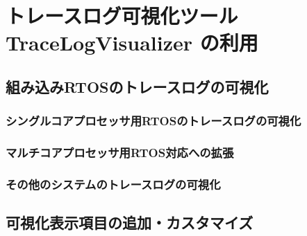 \chapter{トレースログ可視化ツール TraceLogVisualizer の利用}

\section{組み込みRTOSのトレースログの可視化}

\subsection{シングルコアプロセッサ用RTOSのトレースログの可視化}

\subsection{マルチコアプロセッサ用RTOS対応への拡張}

\subsection{その他のシステムのトレースログの可視化}

\section{可視化表示項目の追加・カスタマイズ}
